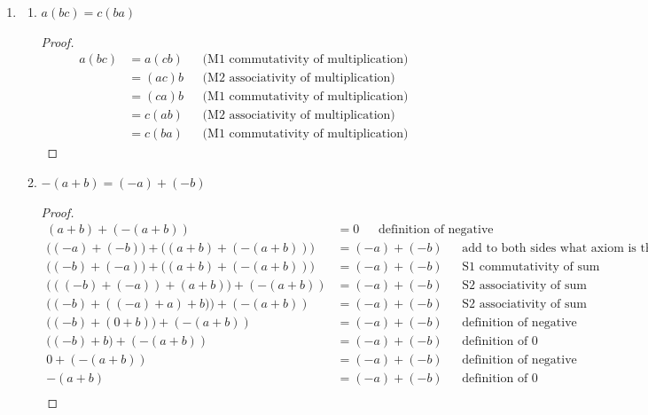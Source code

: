 \begin{enumerate}

\item
  \begin{enumerate}[label=(\alph*)]
  \item \begin{theorem*} $a(bc) = c(ba)$\end{theorem*}
    \begin{proof}
      \begin{align*}
        a(bc) &= a(cb)  ~~~~~~~ \text{(M1 commutativity of multiplication)}\\
              &= (ac)b  ~~~~~~~ \text{(M2 associativity of multiplication)}\\
              &= (ca)b  ~~~~~~~ \text{(M1 commutativity of multiplication)}\\
              &= c(ab)  ~~~~~~~ \text{(M2 associativity of multiplication)}\\
              &= c(ba)  ~~~~~~~ \text{(M1 commutativity of multiplication)}
      \end{align*}
    \end{proof}
  \item
    \begin{theorem*}
      $-(a + b) = (-a) + (-b)$
    \end{theorem*}
    \begin{proof}
      \begin{align*}
        (a + b) + (-(a + b))                   &= 0           ~~~~~~~ \text{definition of negative}\\
        \Big((-a) + (-b)\Big) + \Big((a + b) + (-(a + b))\Big) &= (-a) + (-b) ~~~~~~~ \text{add to both sides what axiom is this?}\\
        \Big((-b) + (-a)\Big) + \Big((a + b) + (-(a + b))\Big)   &= (-a) + (-b) ~~~~~~~ \text{S1 commutativity of sum}\\
        \Big(((-b) + (-a)) + (a + b)\Big) + (-(a + b))   &= (-a) + (-b) ~~~~~~~ \text{S2 associativity of sum}\\
        \Big((-b) + ((-a) + a) + b)\Big) + (-(a + b))    &= (-a) + (-b) ~~~~~~~ \text{S2 associativity of sum}\\
        \Big((-b) + (0 + b)\Big) + (-(a + b))            &= (-a) + (-b) ~~~~~~~ \text{definition of negative}\\
        \Big((-b) + b\Big) + (-(a + b))                &= (-a) + (-b) ~~~~~~~ \text{definition of 0}\\
        0 + (-(a + b))                         &= (-a) + (-b) ~~~~~~~ \text{definition of negative}\\
        -(a + b)                               &= (-a) + (-b) ~~~~~~~ \text{definition of 0}\\
      \end{align*}
    \end{proof}
  \end{enumerate}


\end{enumerate}

